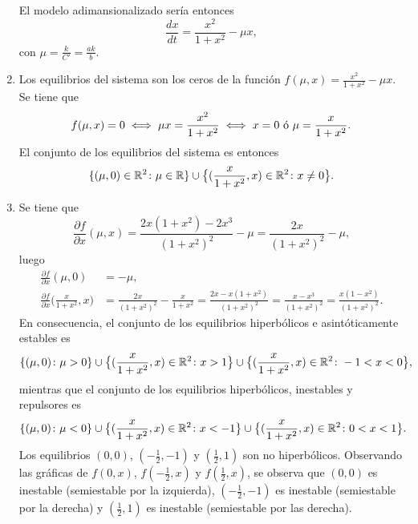 \documentclass[11pt]{report}
\begin{document}
\begin{solution}
\begin{enumerate}
        El modelo adimansionalizado sería entonces
        \[\frac{dx}{dt} = \frac{x^2}{1+x^2}-\mu x,\]
        con $\mu = \frac{k}{C'} = \frac{ak}{b}$.
        \item Los equilibrios del sistema son los ceros de la función $f(\mu,x) = \frac{x^2}{1+x^2}-\mu x$. Se tiene que
        \[f(\mu,x) = 0 \iff \mu x = \frac{x^2}{1+x^2} \iff x = 0 \textup{ ó } \mu = \frac{x}{1+x^2}.\]
        El conjunto de los equilibrios del sistema es entonces
        \[\{(\mu,0) \in\mathbb R^2\colon\mu\in\mathbb R\} \cup \bigl\{(\frac{x}{1+x^2},x) \in\mathbb R^2 \colon x \neq 0\bigr\}.\]
        \item Se tiene que
        \[\frac{\partial f}{\partial x}(\mu,x) = \frac{2x(1+x^2)-2x^3}{(1+x^2)^2}-\mu = \frac{2x}{(1+x^2)^2}-\mu,\]
        luego
        \begin{align*}
            \frac{\partial f}{\partial x}(\mu, 0) &= -\mu, \\
            \frac{\partial f}{\partial x}\bigl(\frac{x}{1+x^2},x\bigr) &= \frac{2x}{(1+x^2)^2}-\frac{x}{1+x^2} = \frac{2x-x(1+x^2)}{(1+x^2)^2} = \frac{x-x^3}{(1+x^2)^2} = \frac{x(1-x^2)}{(1+x^2)^2}. 
        \end{align*}
        En consecuencia, el conjunto de los equilibrios hiperbólicos e asintóticamente estables es
        \[\{(\mu,0)\colon \mu > 0\} \cup \bigl\{(\frac{x}{1+x^2},x)\in\mathbb R^2 \colon x > 1 \bigr\} \cup \bigl\{(\frac{x}{1+x^2},x)\in\mathbb R^2 \colon -1<x<0 \bigr\},\]
        mientras que el conjunto de los equilibrios hiperbólicos, inestables y repulsores es
        \[\{(\mu,0)\colon \mu < 0\} \cup \bigl\{(\frac{x}{1+x^2},x)\in\mathbb R^2 \colon x < -1 \bigr\} \cup \bigl\{(\frac{x}{1+x^2},x)\in\mathbb R^2 \colon 0 < x < 1 \bigr\}.\]
        Los equilibrios $(0,0)$, $(-\frac{1}{2},-1)$ y $(\frac{1}{2},1)$ son no hiperbólicos. Observando las gráficas de $f(0,x)$, $f(-\frac{1}{2},x)$ y $f(\frac{1}{2},x)$, se observa que $(0,0)$ es inestable (semiestable por la izquierda), $(-\frac{1}{2},-1)$ es inestable (semiestable por la derecha) y $(\frac{1}{2},1)$ es inestable (semiestable por las derecha).
    \end{enumerate}
\end{solution}
\end{document}
